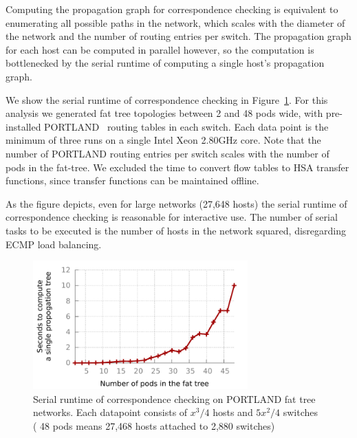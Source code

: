 
 Computing the propagation
graph for correspondence checking is equivalent to enumerating
all possible paths in the network, which scales with the diameter
of the network and the number of routing entries per switch.
The propagation graph for each host can be
computed in parallel however, so the computation is bottlenecked by the serial runtime
of computing a single host's propagation graph.

We show the serial runtime of correspondence checking in 
Figure~\ref{fig:hsa_runtime}. For this analysis we generated fat tree topologies
between 2 and 48 pods wide, with pre-installed PORTLAND~\cite{NiranjanMysore:2009:PSF:1592568.1592575}
routing tables in each switch. Each data point is the minimum of three
runs on a single Intel Xeon 2.80GHz core. Note that the number of PORTLAND routing entries per switch scales with the number
of pods in the fat-tree. We excluded the time to convert
flow tables to HSA transfer functions, since transfer functions can be maintained
offline.

As the figure depicts, even for large networks
(27,648 hosts) the serial runtime of correspondence checking is reasonable for
interactive use. The number of serial tasks to be executed
is the number of hosts in the network squared, disregarding ECMP load balancing.


\begin{figure}[t]
    \includegraphics[width=3.25in]{../graphs/hsa_overhead_graph/graph.pdf}
    \caption[]{\label{fig:hsa_runtime} Serial runtime of correspondence
    checking on PORTLAND fat tree networks. Each datapoint consists of
    $x^3/4$ hosts and $5x^2/4$ switches (\eg{} 48 pods means 27,468 hosts
    attached to 2,880 switches)}
\end{figure}

